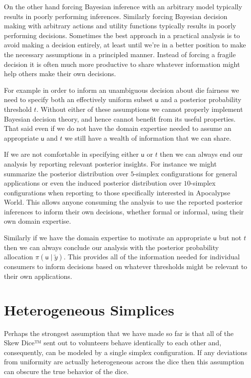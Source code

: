 \documentclass[
  letterpaper,
  DIV=11,
  numbers=noendperiod]{scrartcl}
\begin{document}
On the other hand forcing Bayesian inference with an arbitrary model
typically results in poorly performing inferences. Similarly forcing
Bayesian decision making with arbitrary actions and utility functions
typically results in poorly performing decisions. Sometimes the best
approach in a practical analysis is to avoid making a decision entirely,
at least until we're in a better position to make the necessary
assumptions in a principled manner. Instead of forcing a fragile
decision it is often much more productive to share whatever information
might help others make their own decisions.

For example in order to inform an unambiguous decision about die
fairness we need to specify both an effectively uniform subset
\(\mathsf{u}\) and a posterior probability threshold \(t\). Without
either of these assumptions we cannot properly implement Bayesian
decision theory, and hence cannot benefit from its useful properties.
That said even if we do not have the domain expertise needed to assume
an appropriate \(\mathsf{u}\) and \(t\) we still have a wealth of
information that we can share.

If we are not comfortable in specifying either \(\mathsf{u}\) or \(t\)
then we can always end our analysis by reporting relevant posterior
insights. For instance we might summarize the posterior distribution
over \(5\)-simplex configurations for general applications or even the
induced posterior distribution over \(10\)-simplex configurations when
reporting to those specifically interested in Apocalypse World. This
allows anyone consuming the analysis to use the reported posterior
inferences to inform their own decisions, whether formal or informal,
using their own domain expertise.

Similarly if we have the domain expertise to motivate an appropriate
\(\mathsf{u}\) but not \(t\) then we can always conclude our analysis
with the posterior probability allocation
\(\pi(\mathsf{u} \mid \tilde{y})\). This provides all of the information
needed for individual consumers to inform decisions based on whatever
thresholds might be relevant to their own applications.

\section{Heterogeneous Simplices}\label{heterogeneous-simplices}

Perhaps the strongest assumption that we have made so far is that all of
the Skew Dice™ sent out to volunteers behave identically to each other
and, consequently, can be modeled by a single simplex configuration. If
any deviations from uniformity are actually heterogeneous across the
dice then this assumption can obscure the true behavior of the dice.
\end{document}
